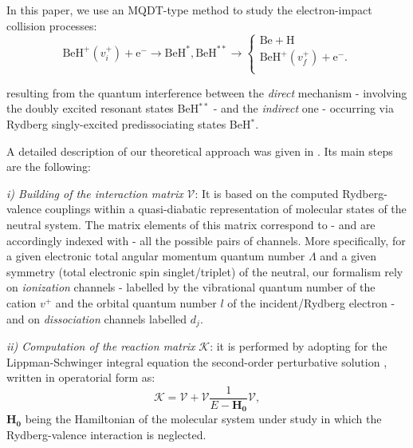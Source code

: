 \documentclass[reviewcopy]{elsarticle}
\begin{document}
In this paper, we  use an MQDT-type method to study the electron-impact collision processes:
\begin{equation}\label{eq:indirect}
\mathrm{BeH}^{+}(v_{i}^{+}) +\mathrm{e}^{-}
\longrightarrow \mathrm{BeH}^{*},
\mathrm{BeH}^{**} \longrightarrow  \left\{
			\begin{array}{ll}
			 \mathrm{Be + H}\\
			 \mathrm{BeH}^{+}(v_{f}^{+})+\mathrm{e}^{-}.\\
			  \end{array}
			  \right.
\end{equation}

\noindent
resulting from the quantum interference between the \textit{direct} mechanism - involving the doubly excited resonant states BeH$^{**}$ - and the \textit{indirect} one - occurring via 
Rydberg singly-excited predissociating states BeH$^{*}$.

A detailed description of our theoretical approach was given in \cite{niyonzima2013}.
Its main steps are the following:

\textit{i) Building of the interaction matrix} $\boldsymbol{\mathcal{V}}$:
It is based on the computed \cite{roos:09,niyonzima2013}
Rydberg-valence couplings within a quasi-diabatic representation of molecular states of the neutral system. The matrix elements of this matrix correspond to - and are accordingly indexed with - all the possible pairs of channels. More specifically, for 
a given electronic total angular momentum quantum number $\Lambda$ 
and 
a given symmetry (total electronic spin singlet/triplet) 
of the neutral, our formalism rely on 
\textit{ionization} channels - 
	labelled by 
	the vibrational quantum number of the cation $v^+$ 
	and 
	the orbital quantum number $l$ of the incident/Rydberg electron - 
and on
\textit{dissociation} channels
	labelled $d_j$.

\textit{ii) Computation of the reaction matrix} $\boldsymbol{\mathcal{K}}$: it is performed by adopting for the Lippman-Schwinger integral equation the second-order perturbative solution
\cite{Ngassam2003a,Florescu2003,Motapon2006}, 
written in operatorial form as:
\begin{equation}\label{eq:solveK}
\boldsymbol{\mathcal{K}}= \boldsymbol{\mathcal{V}} + \boldsymbol{\mathcal{V}}{\frac{1}{E-\boldsymbol{H_0}}}\boldsymbol{\mathcal{V}},
\end{equation}
\noindent
$\boldsymbol{H_0}$ being the Hamiltonian of the molecular system under study in which the Rydberg-valence interaction is neglected.  
\end{document}
